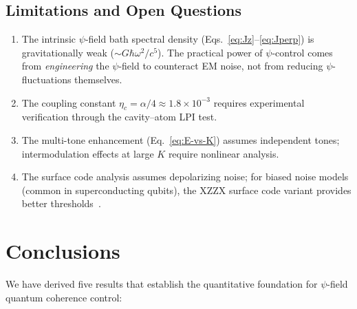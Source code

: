 \documentclass[aps,prl,twocolumn,superscriptaddress,nofootinbib,longbibliography]{revtex4-2}
\begin{document}
\subsection{Limitations and Open Questions}

\begin{enumerate}
\item The intrinsic $\psi$-field bath spectral density
(Eqs.~\ref{eq:Jz}--\ref{eq:Jperp}) is gravitationally weak
($\sim G\hbar\omega^2/c^5$). The practical power of $\psi$-control comes
from \emph{engineering} the $\psi$-field to counteract EM noise, not
from reducing $\psi$-fluctuations themselves.
\item The coupling constant $\eta_c = \alpha/4 \approx 1.8 \times 10^{-3}$
requires experimental verification through the cavity--atom LPI test.
\item The multi-tone enhancement (Eq.~\ref{eq:E-vs-K}) assumes
independent tones; intermodulation effects at large $K$ require
nonlinear analysis.
\item The surface code analysis assumes depolarizing noise; for
biased noise models (common in superconducting qubits), the XZZX
surface code variant provides better thresholds~\cite{Bonilla2021}.
\end{enumerate}

\section{Conclusions}\label{sec:conclusions}

We have derived five results that establish the quantitative foundation
for $\psi$-field quantum coherence control:
\end{document}
